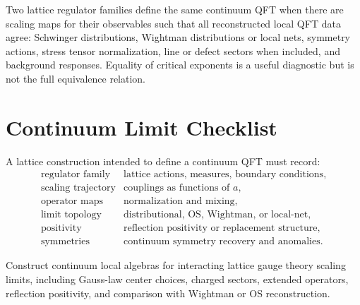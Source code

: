 Two lattice regulator families define the same continuum QFT when there are
scaling maps for their observables such that all reconstructed local QFT data
agree: Schwinger distributions, Wightman distributions or local nets,
symmetry actions, stress tensor normalization, line or defect sectors when
included, and background responses.  Equality of critical exponents is a
useful diagnostic but is not the full equivalence relation.

\section{Continuum Limit Checklist}

A lattice construction intended to define a continuum QFT must record:
\[
\begin{array}{ll}
\text{regulator family} & \text{lattice actions, measures, boundary
conditions},\\
\text{scaling trajectory} & \text{couplings as functions of }a,\\
\text{operator maps} & \text{normalization and mixing},\\
\text{limit topology} & \text{distributional, OS, Wightman, or local-net},\\
\text{positivity} & \text{reflection positivity or replacement structure},\\
\text{symmetries} & \text{continuum symmetry recovery and anomalies}.
\end{array}
\]

\begin{openproblem}
\label{op:local-nets-from-lattice-gauge-limits}
Construct continuum local algebras for interacting lattice gauge theory
scaling limits, including Gauss-law center choices, charged sectors,
extended operators, reflection positivity, and comparison with Wightman or OS
reconstruction.
\end{openproblem}
